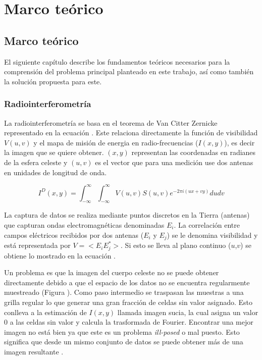 \chapter{Marco teórico}
\label{cap:marco}

\section{Marco teórico}

El siguiente capítulo describe los fundamentos teóricos necesarios para la comprensión del problema principal planteado en este trabajo, así como también la solución propuesta para este. 

\subsection{Radiointerferometría}

La radiointerferometría se basa en el teorema de Van Citter Zernicke  representado en la ecuación . Este relaciona directamente la función de visibilidad $V(u,v)$  y el mapa de misión de energia en radio-frecuencias ($I(x,y)$), es decir la imagen que se quiere obtener.  $(x,y)$ representan las coordenadas en radianes de la esfera celeste \citep{synthesis_taylor} y $(u,v)$ es el vector que para una medición use dos antenas en unidades de longitud de onda.

\begin{equation}
    I^{D}(x, y) = \int_{-\infty}^{\infty}\int_{-\infty}^{\infty}V(u, v)S(u,v)e^{-2\pi i (ux + vy)}dudv
    \label{eq:intensity}
\end{equation}

La captura de datos se realiza mediante puntos discretos en la Tierra (antenas) que capturan ondas electromagnéticas denominadas $E_i$. La correlación entre campos eléctricos recibidos por dos antenas ($E_i$ y $E_j$) se le denomina visibilidad y está representada por $V =<E_{i}E_{j}^{*}>$. Si esto se lleva al plano continuo ($u$,$v$) se obtiene lo mostrado en la ecuación .

Un problema es que la  imagen del cuerpo celeste no se puede obtener directamente debido a que el espacio de los datos no se encuentra regularmente muestreado (Figura ). Como paso intermedio se traspasan las muestras a una grilla regular lo que generar una gran fracción de celdas sin valor asignado. Esto conlleva a la estimación de $I(x,y)$ llamada imagen sucia, la cual asigna un valor 0 a las celdas sin valor y calcula la trasformada de Fourier. Encontrar una mejor imagen no está bien ya que este es un problema \textit{ill-posed} o mal puesto. Esto significa que desde un mismo conjunto de datos se puede obtener más de una imagen resultante \citep{levanda_art}.



